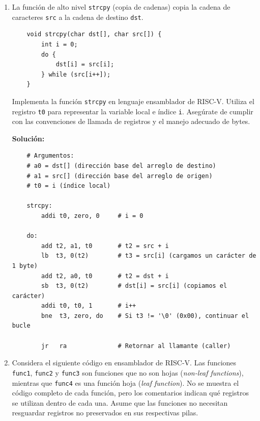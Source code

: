 \documentclass[letterpaper,12pt]{article}
\begin{document}
\begin{enumerate}
\begin{verbatim}
    done:
        j .
    \end{verbatim}
    \color{black}

    \vspace{0.5cm}

    \item La función de alto nivel \texttt{strcpy} (copia de cadenas) copia la cadena de caracteres \texttt{src} a la cadena de destino \texttt{dst}.
    \begin{verbatim}
    void strcpy(char dst[], char src[]) {
        int i = 0;
        do {
            dst[i] = src[i];
        } while (src[i++]);
    }
    \end{verbatim}
    Implementa la función \texttt{strcpy} en lenguaje ensamblador de RISC-V. Utiliza el registro \texttt{t0} para representar la variable local e índice \texttt{i}. Asegúrate de cumplir con las convenciones de llamada de registros y el manejo adecuado de bytes.

    \color{solcolor}
    \textbf{Solución:}
    \begin{verbatim}
    # Argumentos:
    # a0 = dst[] (dirección base del arreglo de destino)
    # a1 = src[] (dirección base del arreglo de origen)
    # t0 = i (índice local)

    strcpy:
        addi t0, zero, 0     # i = 0

    do:
        add t2, a1, t0       # t2 = src + i
        lb  t3, 0(t2)        # t3 = src[i] (cargamos un carácter de 1 byte)
        add t2, a0, t0       # t2 = dst + i
        sb  t3, 0(t2)        # dst[i] = src[i] (copiamos el carácter)
        addi t0, t0, 1       # i++
        bne  t3, zero, do    # Si t3 != '\0' (0x00), continuar el bucle

        jr   ra              # Retornar al llamante (caller)
    \end{verbatim}
    \color{black}

    \vspace{0.5cm}
    \pagebreak

    \item Considera el siguiente código en ensamblador de RISC-V. Las funciones \texttt{func1}, \texttt{func2} y \texttt{func3} son funciones que no son hojas (\textit{non-leaf functions}), mientras que \texttt{func4} es una función hoja (\textit{leaf function}). No se muestra el código completo de cada función, pero los comentarios indican qué registros se utilizan dentro de cada una. Asume que las funciones no necesitan resguardar registros no preservados en sus respectivas pilas.
    

\end{enumerate}
\end{document}
